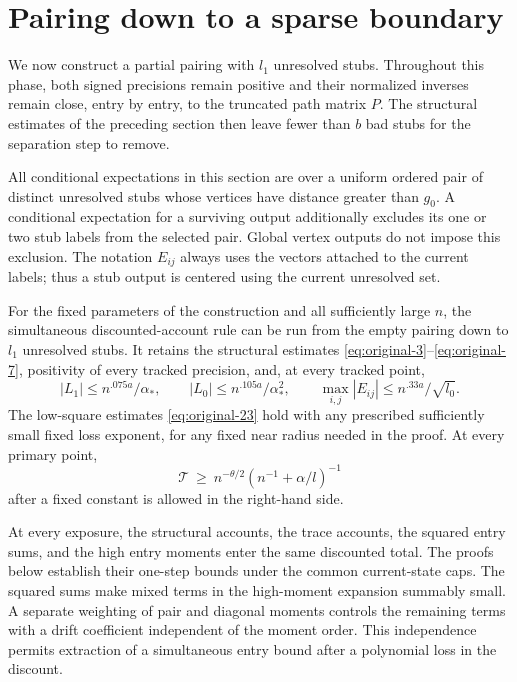 \section{Pairing down to a sparse boundary}\label{sec:early-phase}

We now construct a partial pairing with $l_1$ unresolved stubs. Throughout
this phase, both signed precisions remain positive and their normalized
inverses remain close, entry by entry, to the truncated path matrix $P$.
The structural estimates of the preceding section then leave fewer than
$b$ bad stubs for the separation step to remove.

All conditional expectations in this section are over a uniform ordered
pair of distinct unresolved stubs whose vertices have distance greater than
\(g_0\). A conditional expectation for a surviving output additionally
excludes its one or two stub labels from the selected pair. Global vertex
outputs do not impose this exclusion. The notation \(E_{ij}\) always uses
the vectors attached to the current labels; thus a stub output is centered
using the current unresolved set.

\begin{proposition}\label{prop:early-phase}
For the fixed parameters of the construction and all sufficiently large
\(n\), the simultaneous discounted-account rule can be run from the empty
pairing down to \(l_1\) unresolved stubs. It retains the structural estimates
\eqref{eq:original-3}--\eqref{eq:original-7}, positivity of every tracked
precision, and, at every tracked point,
\[
 |L_1|\le n^{.075a}/\alpha_*,\qquad
 |L_0|\le n^{.105a}/\alpha_*^2,\qquad
 \max_{i,j}|E_{ij}|\le n^{.33a}/\sqrt{l_0}.
\]
The low-square estimates \eqref{eq:original-23} hold with any prescribed
sufficiently small fixed loss exponent, for any fixed near radius needed
in the proof. At every primary point,
\begin{equation}
 \mathcal T \ \ge\ n^{-\theta/2}(n^{-1}+\alpha/l)^{-1}
\label{eq:original-13}
\end{equation}
after a fixed constant is allowed in the right-hand side.
\end{proposition}

At every exposure, the structural accounts, the trace accounts, the
squared entry sums, and the high entry moments enter the same discounted
total. The proofs below establish their one-step bounds under the common
current-state caps. The squared sums make mixed terms in the high-moment
expansion summably small. A separate weighting of pair and diagonal
moments controls the remaining terms with a drift coefficient independent
of the moment order. This independence permits extraction of a
simultaneous entry bound after a polynomial loss in the discount.

